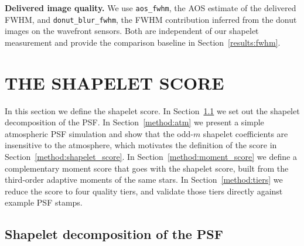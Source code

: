 \documentclass[]{spie}
\begin{document}
\textbf{Delivered image quality.} We use \texttt{aos\_fwhm}, the AOS estimate of the
delivered FWHM, and \texttt{donut\_blur\_fwhm}, the FWHM contribution inferred from the
donut images on the wavefront sensors. Both are independent of our shapelet measurement and
provide the comparison baseline in Section~\ref{results:fwhm}.


\section{THE SHAPELET SCORE}
\label{method:0}

In this section we define the shapelet score. In Section~\ref{method:shapelet} we set out
the shapelet decomposition of the PSF. In Section~\ref{method:atm} we present a simple
atmospheric PSF simulation and show that the odd-$m$ shapelet coefficients are insensitive
to the atmosphere, which motivates the definition of the score in
Section~\ref{method:shapelet_score}. In Section~\ref{method:moment_score} we define a
complementary moment score that goes with the shapelet score, built from the third-order
adaptive moments of the same stars. In Section~\ref{method:tiers} we reduce the score to
four quality tiers, and validate those tiers directly against example PSF stamps.

\subsection{Shapelet decomposition of the PSF}
\label{method:shapelet}
\end{document}

